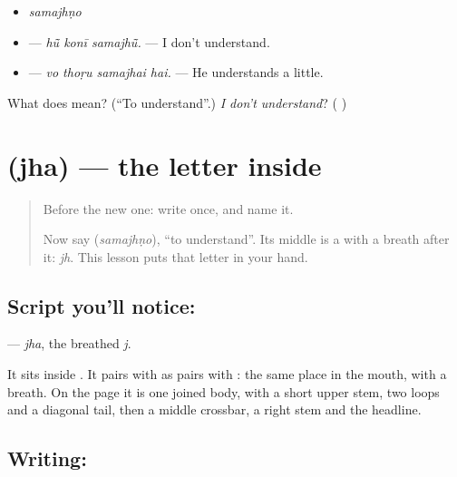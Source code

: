 \begin{itemize}
\raggedright
  \item \emph{samajhṇo}
  \item \textbf{  } — \emph{hū̃ konī samajhū̃.} — I don't understand.
  \item \textbf{   } — \emph{vo thoṛu samajhai hai.} — He understands a little.
\end{itemize}

\begin{tcolorbox}[breakable,colback=teal!4,colframe=teal!35!black,title={Before you move on}]
What does \textbf{} mean? (\textquotedblleft{}To understand\textquotedblright{}.) \emph{I don't understand}? (\textbf{  })
\end{tcolorbox}
\section[\texorpdfstring{\mw{झ} (jha)}{झ (jha)}]{ (jha) — the letter inside }

\label{lesson:MW-W47-jha}



\begin{quote}
Before the new one: write \textbf{} once, and name it.

Now say \textbf{} (\emph{samajhṇo}), \textquotedblleft{}to understand\textquotedblright{}. Its middle is a \textbf{} with a breath after it: \emph{jh}. This lesson puts that letter in your hand.
\end{quote}

\subsection*{Script you'll notice: }
\textbf{} — \emph{jha}, the breathed \emph{j}.

It sits inside \textbf{}. It pairs with \textbf{} as \textbf{} pairs with \textbf{}: the same place in the mouth, with a breath. On the page it is one joined body, with a short upper stem, two loops and a diagonal tail, then a middle crossbar, a right stem and the headline.

\subsection*{Writing: }

